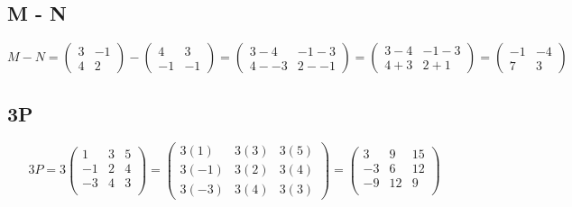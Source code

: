 \documentclass[a4paper,12pt]{article}
\begin{document}
    \subsection{M - N}
      \begin{equation}
        M - N =
        \begin{pmatrix}
          3 & -1\\
          4 &  2
        \end{pmatrix}
        -
        \begin{pmatrix}
           4 & 3\\
          -1 & -1
        \end{pmatrix}
        =
        \begin{pmatrix}
          3 - 4 & -1 - 3\\
          4 - -3 & 2 - -1
        \end{pmatrix}
        =
        \begin{pmatrix}
          3 - 4 & -1 - 3\\
          4 + 3 & 2 + 1
        \end{pmatrix}
        =
        \begin{pmatrix}
          -1 & -4\\
          7 & 3
        \end{pmatrix}
      \end{equation}

    \subsection{3P}
      \begin{equation}
        3P =
        3
        \begin{pmatrix}
          1 & 3 & 5\\
          -1 & 2 & 4\\
          -3 & 4 & 3\\
        \end{pmatrix}
        =
        \begin{pmatrix}
          3(1) & 3(3) & 3(5)\\
          3(-1) & 3(2) & 3(4)\\
          3(-3) & 3(4) & 3(3)
        \end{pmatrix}
        =
        \begin{pmatrix}
          3 & 9 & 15\\
          -3 & 6 & 12\\
          -9 & 12 & 9\\
        \end{pmatrix}
      \end{equation}
\end{document}
